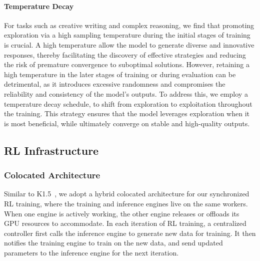 \paragraph{Temperature Decay}

For tasks such as creative writing and complex reasoning, we find that promoting exploration via a high sampling temperature during the initial stages of training is crucial. 
A high temperature allow the model to generate diverse and innovative responses, thereby facilitating the discovery of effective strategies and reducing the risk of premature convergence to suboptimal solutions. 
However, retaining a high temperature in the later stages of training or during evaluation can be detrimental, as it introduces excessive randomness and compromises the reliability and consistency of the model's outputs. 
To address this, we employ a temperature decay schedule, to shift from exploration to exploitation throughout the training. This strategy ensures that the model leverages exploration when it is most beneficial, while ultimately converge on stable and high-quality outputs.



























\subsection{RL Infrastructure}

\subsubsection{Colocated Architecture}
Similar to K1.5~\citep{team2025kimi}, we adopt a hybrid colocated architecture for our synchronized RL training, where the training and inference engines live on the same workers. When one engine is actively working, the other engine releases or offloads its GPU resources to accommodate. In each iteration of RL training, a centralized controller first calls the inference engine to generate new data for training. It then notifies the training engine to train on the new data, and send updated parameters to the inference engine for the next iteration. 

